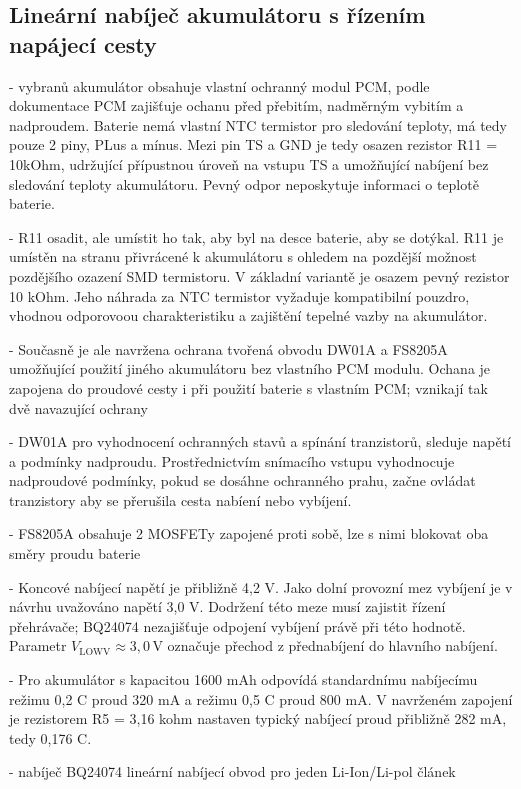 \subsection{Lineární nabíječ akumulátoru s řízením napájecí cesty }
- vybranů akumulátor obsahuje vlastní ochranný modul PCM, podle dokumentace PCM zajišťuje ochanu před přebitím, nadměrným vybitím a nadproudem. Baterie nemá vlastní NTC termistor pro sledování teploty, má tedy pouze 2 piny, PLus a mínus. Mezi pin TS a GND je tedy osazen rezistor R11 = 10kOhm, udržující přípustnou úroveň na vstupu TS a umožňující nabíjení bez sledování teploty akumulátoru. Pevný odpor neposkytuje informaci o  teplotě baterie. 

- R11 osadit, ale umístit ho tak, aby byl na desce baterie, aby se dotýkal. R11 je umístěn na stranu přivrácené k akumulátoru s ohledem na pozdější možnost pozdějšího ozazení SMD termistoru. V základní variantě je osazem pevný rezistor 10 kOhm. Jeho náhrada za NTC termistor vyžaduje kompatibilní pouzdro, vhodnou odporovoou charakteristiku a zajištění tepelné vazby na akumulátor. 

- Současně je ale navržena ochrana tvořená obvodu DW01A a FS8205A umožňující použití jiného akumulátoru bez vlastního PCM modulu. Ochana je zapojena do proudové cesty i při použití baterie s vlastním PCM; vznikají tak dvě navazující ochrany

- DW01A pro vyhodnocení ochranných stavů a spínání tranzistorů, sleduje napětí a podmínky nadproudu. Prostřednictvím snímacího vstupu vyhodnocuje nadproudové podmínky, pokud se dosáhne ochranného prahu, začne ovládat tranzistory aby se přerušila cesta nabíení nebo vybíjení.

- FS8205A obsahuje 2 MOSFETy zapojené proti sobě, lze s nimi blokovat oba směry proudu baterie

- Koncové nabíjecí napětí je přibližně 4,2 V. Jako dolní provozní mez vybíjení je v návrhu uvažováno napětí 3,0 V. Dodržení této meze musí zajistit řízení přehrávače; BQ24074 nezajišťuje odpojení vybíjení právě při této hodnotě. Parametr \(V_{\mathrm{LOWV}}\approx3{,}0\,\mathrm{V}\) označuje přechod z přednabíjení do hlavního nabíjení.

- Pro akumulátor s kapacitou 1600 mAh odpovídá standardnímu nabíjecímu režimu 0,2 C proud 320 mA a režimu 0,5 C proud 800 mA. V navrženém zapojení je rezistorem R5 = 3,16 kohm nastaven typický nabíjecí proud přibližně 282 mA, tedy 0,176 C.

- nabíječ BQ24074 lineární nabíjecí obvod pro jeden Li-Ion/Li-pol článek

